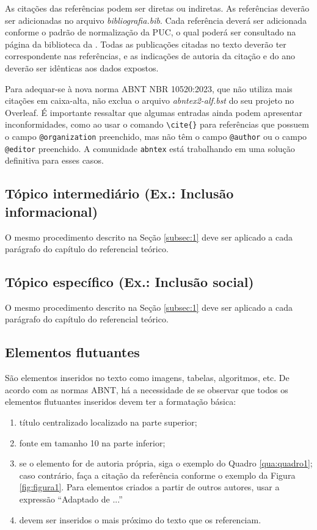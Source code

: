 As citações das referências podem ser diretas ou indiretas. As referências deverão ser adicionadas no arquivo \textit{bibliografia.bib}. Cada referência deverá ser adicionada conforme o padrão de normalização da PUC, 
o qual poderá ser consultado na página da biblioteca da . Todas as publicações citadas no texto deverão ter correspondente nas referências, 
e as indicações de autoria da citação e do ano deverão ser idênticas aos dados expostos. 

Para adequar-se à nova norma ABNT NBR 10520:2023, que não utiliza mais citações em caixa-alta, não exclua o arquivo \textit{abntex2-alf.bst} do seu projeto no Overleaf. É importante ressaltar que algumas entradas ainda podem apresentar inconformidades, como ao usar o comando \verb|\cite{}| para referências que possuem o campo \verb|@organization| preenchido, mas não têm o campo \verb|@author| ou o campo \verb|@editor| preenchido. A comunidade \texttt{abntex} está trabalhando em uma solução definitiva para esses casos. 

\estrutura\subsection{\esp Tópico intermediário (Ex.: Inclusão informacional) }\instrucao
O mesmo procedimento descrito na Seção \ref{subsec:1} deve ser aplicado a cada parágrafo do capítulo do referencial teórico.

\estrutura\subsection{\esp Tópico específico (Ex.: Inclusão social) }\instrucao
O mesmo procedimento descrito na Seção \ref{subsec:1} deve ser aplicado a cada parágrafo do capítulo do referencial teórico.




\estrutura\subsection{\esp Elementos flutuantes}\instrucao

São elementos inseridos no texto como imagens, tabelas, algoritmos, etc.
De acordo com as normas ABNT, há a necessidade de se observar que todos os elementos flutuantes inseridos devem ter a formatação básica:

\begin{enumerate} [label={\alph*})]
 \item título centralizado localizado na parte superior; 
 \item fonte em tamanho 10 na parte inferior;
 \item se o elemento for de autoria própria, siga o exemplo do Quadro \ref{qua:quadro1}; caso contrário, faça a citação da referência conforme o exemplo da Figura \ref{fig:figura1}. Para elementos criados a partir de outros autores, usar a expressão  ``Adaptado de ...'' 
 \item devem ser inseridos o mais próximo do texto que os referenciam.
\end{enumerate}


